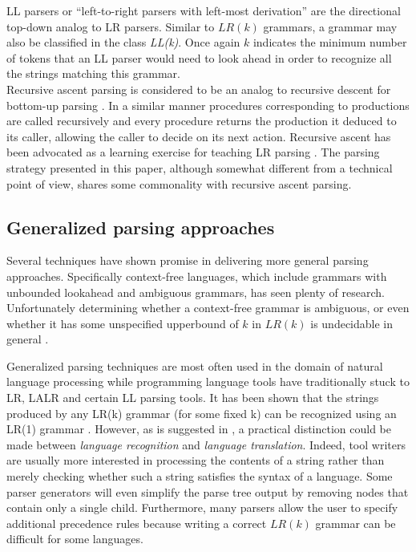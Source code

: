 \documentclass[a4paper,11pt]{article}
\begin{document}
LL parsers or ``left-to-right parsers with left-most derivation'' are the directional top-down analog to LR parsers.
Similar to $LR(k)$ grammars, a grammar may also be classified in the class \emph{LL(k)}.
Once again $k$ indicates the minimum number of tokens that an LL parser would need to look ahead in order to recognize all the strings matching this grammar.\\

Recursive ascent parsing is considered to be an analog to recursive descent for bottom-up parsing \cite{47909}.
In a similar manner procedures corresponding to productions are called recursively and every procedure returns the production it deduced to its caller, allowing the caller to decide on its next action.
Recursive ascent has been advocated as a learning exercise for teaching LR parsing \cite{770849}.
The parsing strategy presented in this paper, although somewhat different from a technical point of view, shares some commonality with recursive ascent parsing.

\subsection{Generalized parsing approaches}

Several techniques have shown promise in delivering more general parsing approaches.
Specifically context-free languages, which include grammars with unbounded lookahead and ambiguous grammars, has seen plenty of research.
Unfortunately determining whether a context-free grammar is ambiguous, or even whether it has some unspecified upperbound of $k$ in $LR(k)$ is undecidable in general \cite{knuth65}.

Generalized parsing techniques are most often used in the domain of natural language processing while programming language tools have traditionally stuck to LR, LALR and certain LL parsing tools.
It has been shown that the strings produced by any LR(k) grammar (for some fixed k) can be recognized using an LR(1) grammar \cite{knuth65}.
However, as is suggested in \cite{Parr95lland}, a practical distinction could be made between \emph{language recognition} and \emph{language translation}.
Indeed, tool writers are usually more interested in processing the contents of a string rather than merely checking whether such a string satisfies the syntax of a language.
Some parser generators will even simplify the parse tree output by removing nodes that contain only a single child. %
Furthermore, many parsers allow the user to specify additional precedence rules because writing a correct $LR(k)$ grammar can be difficult for some languages.
\end{document}
